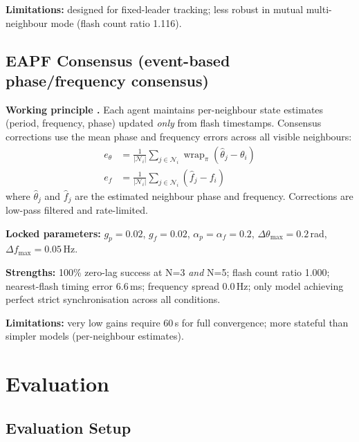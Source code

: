 \documentclass[11pt,a4paper]{article}
\begin{document}
\textbf{Limitations:} designed for fixed-leader tracking; less robust in
mutual multi-neighbour mode (flash count ratio 1.116).

\subsection{EAPF Consensus (event-based phase/frequency consensus)}

\textbf{Working principle \cite{gardner2005phaselock,olfati2007consensus}.}
Each agent maintains per-neighbour state estimates (period, frequency, phase)
updated \emph{only} from flash timestamps.  Consensus corrections use the mean
phase and frequency errors across all visible neighbours:
\begin{align}
  e_\theta &= \frac{1}{|\mathcal{N}_i|}\sum_{j\in\mathcal{N}_i}
             \operatorname{wrap}_\pi(\hat\theta_j - \theta_i) \\
  e_f      &= \frac{1}{|\mathcal{N}_i|}\sum_{j\in\mathcal{N}_i}
             (\hat f_j - f_i)
\end{align}
where $\hat\theta_j$ and $\hat f_j$ are the estimated neighbour phase and
frequency.  Corrections are low-pass filtered and rate-limited.

\textbf{Locked parameters:} $g_p = 0.02$, $g_f = 0.02$,
$\alpha_p = \alpha_f = 0.2$, $\Delta\theta_{\max} = 0.2$\,rad,
$\Delta f_{\max} = 0.05$\,Hz.

\textbf{Strengths:} 100\% zero-lag success at N=3 \emph{and} N=5; flash count
ratio 1.000; nearest-flash timing error 6.6\,ms; frequency spread 0.0\,Hz;
only model achieving perfect strict synchronisation across all conditions.

\textbf{Limitations:} very low gains require 60\,s for full convergence;
more stateful than simpler models (per-neighbour estimates).

\section{Evaluation}

\subsection{Evaluation Setup}
\end{document}
